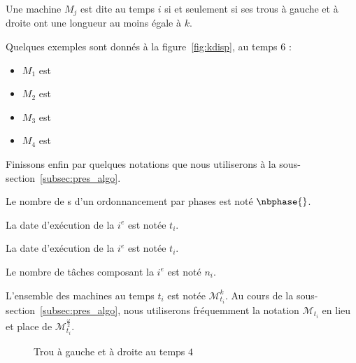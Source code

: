 \documentclass[a4paper,9pt]{article}
\begin{document}
\begin{ndf}
    Une machine $M_j$ est dite  au temps $i$ si et seulement si ses trous à gauche et à
    droite ont une longueur au moins égale à $k$.

    Quelques exemples sont donnés à la figure~\ref{fig:kdisp}, au temps $6$ : 
    \begin{itemize}
        \item $M_1$ est 
        \item $M_2$ est 
        \item $M_3$ est 
        \item $M_4$ est \authmach{\infty}
    \end{itemize}
\end{ndf}

Finissons enfin par quelques notations que nous utiliserons à la
sous-section~\ref{subsec:pres_algo}.

\begin{nnot}
    Le nombre de \tphase{}s d'un ordonnancement par phases est noté $\nbphase{}$.
\end{nnot}

\begin{nnot}
    La date d'exécution de la $i^e$ \tphase{} est notée $t_i$.
\end{nnot}

\begin{nnot}
    La date d'exécution de la $i^e$ \tphase{} est notée $t_i$.
\end{nnot}

\begin{nnot}
    Le nombre de tâches composant la $i^e$ \tphase{} est noté $n_i$.
\end{nnot}

\begin{nnot}
    L'ensemble des machines  au temps $t_i$ est notée $\mathcal{M}^{k}_{t_i}$. Au cours
    de la sous-section~\ref{subsec:pres_algo}, nous utiliserons fréquemment la notation
    $\mathcal{M}_{t_i}$ en lieu et place de $\mathcal{M}_{t_i}^{\frac{\omega}{2}}$.
\end{nnot}

\begin{figure}
    \centering
    \begin{ordo}[10]{1}{1}{12}
    \end{ordo}
    \caption{Trou à gauche et à droite au temps $4$}
    \label{fig:tagtad}
\end{figure}
\end{document}
